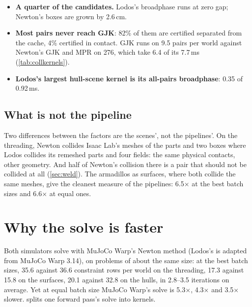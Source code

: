 \begin{itemize}
\item \textbf{A quarter of the candidates.} Lodos's broadphase runs at zero gap; Newton's boxes are grown by 2.6\,cm.
\item \textbf{Most pairs never reach GJK}: 82\% of them are certified separated from the cache, 4\% certified in contact. GJK runs on 9.5 pairs per world against Newton's GJK and MPR on 276, which take 6.4 of its 7.7\,ms (\cref{tab:collkernels}).
\item \textbf{Lodos's largest hull-scene kernel is its all-pairs broadphase}: 0.35 of 0.92\,ms.
\end{itemize}

\subsection{What is not the pipeline}\label{sec:notpipeline}

Two differences between the factors are the scenes', not the pipelines'. On the threading, Newton collides Isaac Lab's meshes of the parts and two boxes where Lodos collides its remeshed parts and four fields: the same physical contacts, other geometry. And half of Newton's collision there is a pair that should not be collided at all (\cref{sec:weld}). The armadillos as surfaces, where both collide the same meshes, give the cleanest measure of the pipelines: 6.5$\times$ at the best batch sizes and 6.6$\times$ at equal ones.

\section{Why the solve is faster}\label{sec:solve}

Both simulators solve with MuJoCo Warp's Newton method (Lodos's is adapted from MuJoCo Warp 3.14), on problems of about the same size: at the best batch sizes, 35.6 against 36.6 constraint rows per world on the threading, 17.3 against 15.8 on the surfaces, 20.1 against 32.8 on the hulls, in 2.8--3.5 iterations on average. Yet at equal batch size MuJoCo Warp's solve is 5.3$\times$, 4.3$\times$ and 3.5$\times$ slower.  splits one forward pass's solve into kernels.

